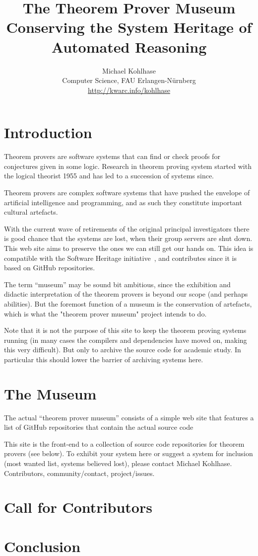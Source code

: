 \documentclass[12pt]{article}
\title{The Theorem Prover Museum\\ Conserving the System Heritage of Automated Reasoning}
\author{Michael Kohlhase\\Computer Science, FAU Erlangen-N\"urnberg\\\url{http://kwarc.info/kohlhase}}
\begin{document}
\maketitle
\begin{abstract}
\end{abstract}
\section{Introduction}\label{sec:intro}

Theorem provers are software systems that can find or check proofs for conjectures given
in some logic. Research in theorem proving system started with the logical theorist 1955
and has led to a succession of systems since.

Theorem provers are complex software systems that have pushed the envelope of artificial
intelligence and programming, and as such they constitute important cultural artefacts.

With the current wave of retirements of the original principal investigators there is good
chance that the systems are lost, when their group servers are shut down. This web site
aims to preserve the ones we can still get our hands on. This idea is compatible with the
Software Heritage initiative~\cite{SoftwareHeritage:on}, and contributes since it is based
on GitHub repositories.

The term ``museum'' may be sound bit ambitious, since the exhibition and didactic
interpretation of the theorem provers is beyond our scope (and perhaps abilities). But the
foremost function of a museum is the conservation of artefacts, which is what the "theorem
prover museum" project intends to do.

Note that it is not the purpose of this site to keep the theorem proving systems running
(in many cases the compilers and dependencies have moved on, making this very
difficult). But only to archive the source code for academic study. In particular this
should lower the barrier of archiving systems here.

\section{The Museum}

The actual ``theorem prover museum'' consists of a simple web site that features a list of
GitHub repositories that contain the actual source code 

This site is the front-end to a collection of source code repositories for theorem provers
(see below). To exhibit your system here or suggest a system for inclusion (most wanted
list, systems believed lost), please contact Michael Kohlhase. Contributors,
community/contact, project/issues.

\section{Call for Contributors}

\section{Conclusion}\label{sec:concl}
\printbibliography
\end{document}
